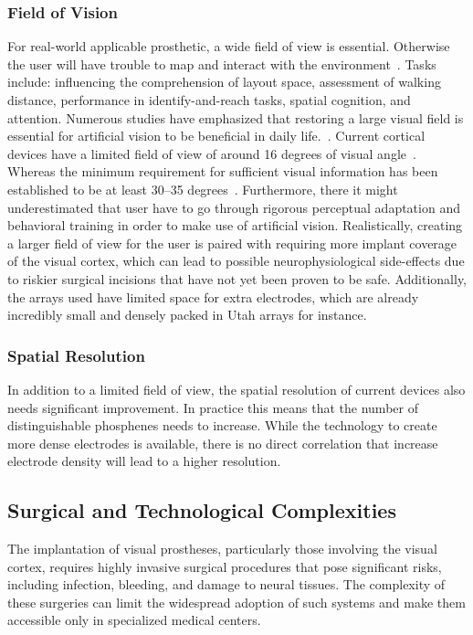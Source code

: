 \documentclass[twocolumn,10pt]{article}
\begin{document}
\subsubsection*{Field of Vision}
For real-world applicable prosthetic, a wide field of view is essential.
Otherwise the user will have trouble to map and interact with the
environment~\parencite{sugawaraRelationshipPeripheralVisual2010}. Tasks include:
influencing the comprehension of layout space, assessment of walking distance,
performance in identify-and-reach tasks, spatial cognition, and attention.
Numerous studies have emphasized that restoring a large visual field is
essential for artificial vision to be beneficial in daily
life.~\parencite{subhiFunctionalVisualFields2017,sugawaraRelationshipPeripheralVisual2010}.
Current cortical devices have a limited field of view of around 16 degrees of
visual angle~\parencite{vandergrintenBiologicallyPlausiblePhosphene2024}.
Whereas the minimum requirement for sufficient visual information has been
established to be at least 30--35
degrees~\parencite{sommerhalderProspectsLimitationsSpatial2017}. Furthermore,
there it might underestimated that user have to go through rigorous perceptual
adaptation and behavioral training in order to make use of artificial vision.
Realistically, creating a larger field of view for the user is paired with
requiring more implant coverage of the visual cortex, which can lead to possible
neurophysiological side-effects due to riskier surgical incisions that have not
yet been proven to be safe. Additionally, the arrays used have limited space for
extra electrodes, which are already incredibly small and densely packed in Utah
arrays for instance.

\subsubsection*{Spatial Resolution}
In addition to a limited field of view, the spatial resolution of current
devices also needs significant improvement. In practice this means that the
number of distinguishable phosphenes needs to increase. While the technology to
create more dense electrodes is available, there is no direct correlation that
increase electrode density will lead to a higher resolution.


\subsection*{Surgical and Technological Complexities}
The implantation of visual prostheses, particularly those involving the visual cortex, requires highly invasive surgical procedures that pose significant risks, including infection, bleeding, and damage to neural tissues. The complexity of these surgeries can limit the widespread adoption of such systems and make them accessible only in specialized medical centers.
\end{document}
